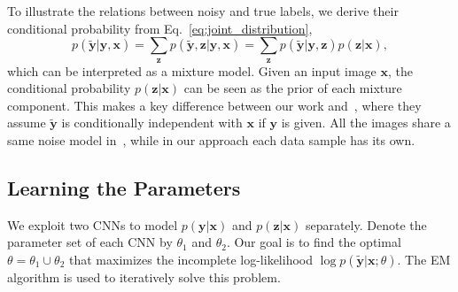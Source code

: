 \documentclass[10pt,twocolumn,letterpaper]{article}
\def\vec{\mathbf}
\begin{document}
To illustrate the relations between noisy and true labels, we derive their conditional probability from Eq.~\ref{eq:joint_distribution},
\begin{equation}
    p(\tilde{\vec{y}} | \vec{y}, \vec{x}) = \sum_{\vec{z}} p(\tilde{\vec{y}}, \vec{z} | \vec{y}, \vec{x}) = \sum_{\vec{z}} p(\tilde{\vec{y}} | \vec{y}, \vec{z}) p(\vec{z} | \vec{x}),
\end{equation}
which can be interpreted as a mixture model. Given an input image $\vec{x}$, the conditional probability $p(\vec{z} | \vec{x})$ can be seen as the prior of each mixture component. This makes a key difference between our work and~\cite{sukhbaatar2014learning}, where they assume $\tilde{\vec{y}}$ is conditionally independent with $\vec{x}$ if $\vec{y}$ is given. All the images share a same noise model in~\cite{sukhbaatar2014learning}, while in our approach each data sample has its own.

\subsection{Learning the Parameters} %
\label{sub:learning_the_parameters}
We exploit two CNNs to model $p(\vec{y} | \vec{x})$ and $p(\vec{z} | \vec{x})$ separately. Denote the parameter set of each CNN by $\theta_1$ and $\theta_2$. Our goal is to find the optimal $\theta = \theta_1 \cup \theta_2$ that maximizes the incomplete log-likelihood $\log p(\tilde{\vec{y}} | \vec{x}; \theta)$. The EM algorithm is used to iteratively solve this problem.
\end{document}
